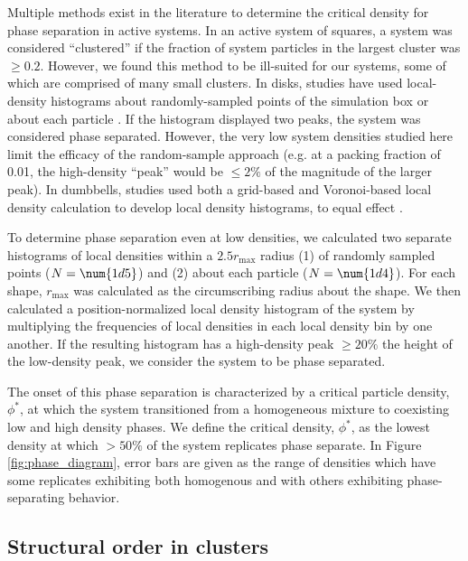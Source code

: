 Multiple methods exist in the literature to determine the critical density for phase separation in active systems.
In an active system of squares\cite{Prymidis_2016_SoftMatter}, a system was considered ``clustered'' if the fraction of system particles in the largest cluster was ${\geq}0.2$.
However, we found this method to be ill-suited for our systems, some of which are comprised of many small clusters.
In disks, studies have used local-density histograms about randomly-sampled points of the simulation box \cite{Bruss_2018_PRE} or about each particle \cite{Redner_2013_PRL}.
If the histogram displayed two peaks, the system was considered phase separated.
However, the very low system densities studied here limit the efficacy of the random-sample approach (e.g. at a packing fraction of 0.01, the high-density ``peak'' would be ${\leq}2\%$ of the magnitude of the larger peak).
In dumbbells, studies used both a grid-based and Voronoi-based local density calculation to develop local density histograms, to equal effect \cite{Petrelli_2018_EPJ}.

To determine phase separation even at low densities, we calculated two separate histograms of local densities within a $2.5r_\text{max}$ radius (1) of randomly sampled points ($N=\num{1d5}$) and (2) about each particle ($N=\num{1d4}$).
For each shape, $r_\text{max}$ was calculated as the circumscribing radius about the shape.
We then calculated a position-normalized local density histogram of the system by multiplying the frequencies of local densities in each local density bin by one another.
If the resulting histogram has a high-density peak ${\geq}20\%$ the height of the low-density peak, we consider the system to be phase separated.

The onset of this phase separation is characterized by a critical particle density, $\phi^*$, at which the system transitioned from a homogeneous mixture to coexisting low and high density phases.
We define the critical density, $\phi^*$, as the lowest density at which $>50\%$ of the system replicates phase separate.
In Figure \ref{fig:phase_diagram}, error bars are given as the range of densities which have some replicates exhibiting both homogenous and with others exhibiting phase-separating behavior.


\subsection{Structural order in clusters}
\label{sec:order}

